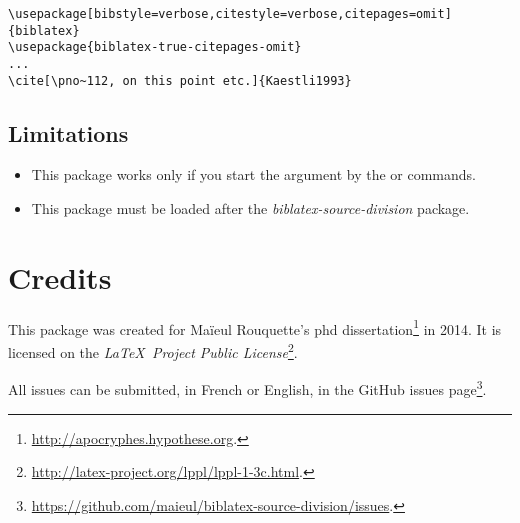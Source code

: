 \documentclass{ltxdockit}[2011/03/25]
\begin{document}
\begin{verbatim}
\usepackage[bibstyle=verbose,citestyle=verbose,citepages=omit]{biblatex}
\usepackage{biblatex-true-citepages-omit}
...
\cite[\pno~112, on this point etc.]{Kaestli1993}
\end{verbatim}


\citereset
{}
\begin{quotation}
\cite[\pno~112, on this point etc.]{Kaestli1993}
\end{quotation}
\subsection{Limitations}

\begin{itemize}
	\item This package works only if you start the    argument by the  or  commands.
	\item This package must be loaded after the \emph{biblatex-source-division} package.
\end{itemize}
\section{Credits}

This package was created for Maïeul Rouquette's phd dissertation\footnote{\url{http://apocryphes.hypothese.org}.} in 2014. It is licensed on the \emph{\LaTeX\ Project Public License}\footnote{\url{http://latex-project.org/lppl/lppl-1-3c.html}.}. 


All issues can be submitted, in French or English, in the GitHub issues page\footnote{\url{https://github.com/maieul/biblatex-source-division/issues}.}.
\end{document}
